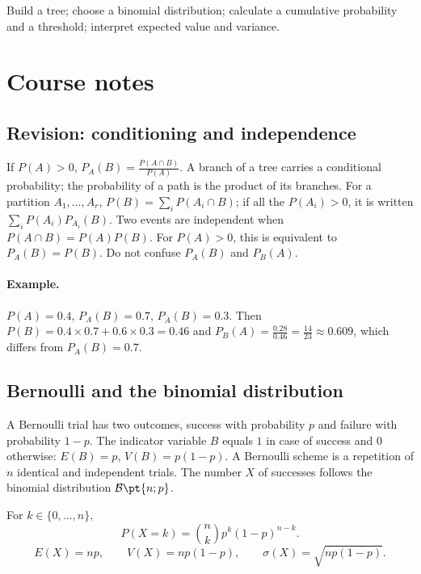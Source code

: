 \label{ch:13}


\begin{keypoint}[Objectives]Build a tree; choose a binomial distribution; calculate a cumulative probability and a threshold; interpret expected value and variance.\end{keypoint}

\section{Course notes}
\subsection{Revision: conditioning and independence}
If $P(A)>0$, $P_A(B)=\frac{P(A\cap B)}{P(A)}$. A branch of a tree carries a conditional probability; the probability of a path is the product of its branches. For a partition $A_1,\ldots,A_r$, $P(B)=\sum_iP(A_i\cap B)$; if all the $P(A_i)>0$, it is written $\sum_iP(A_i)P_{A_i}(B)$.
Two events are independent when $P(A\cap B)=P(A)P(B)$. For $P(A)>0$, this is equivalent to $P_A(B)=P(B)$. Do not confuse $P_A(B)$ and $P_B(A)$.
\paragraph{Example.} $P(A)=\num{0,4}$, $P_A(B)=\num{0,7}$, $P_{\overline A}(B)=\num{0,3}$. Then $P(B)=\num{0,4}\times\num{0,7}+\num{0,6}\times\num{0,3}=\num{0,46}$ and $P_B(A)=\frac{\num{0,28}}{\num{0,46}}=\frac{14}{23}\approx\num{0,609}$, which differs from $P_A(B)=\num{0,7}$.
\subsection{Bernoulli and the binomial distribution}
A Bernoulli trial has two outcomes, success with probability $p$ and failure with probability $1-p$. The indicator variable $B$ equals $1$ in case of success and $0$ otherwise: $E(B)=p$, $V(B)=p(1-p)$.
A Bernoulli scheme is a repetition of $n$ identical and independent trials. The number $X$ of successes follows the binomial distribution $\mathcal B\pt{n;p}$.
\begin{keypoint}
For $k\in\{0,\ldots,n\}$,
\[P(X=k)=\binom nk p^k(1-p)^{n-k}.\]\[E(X)=np,\qquad V(X)=np(1-p),\qquad\sigma(X)=\sqrt{np(1-p)}.\]
\end{keypoint}
